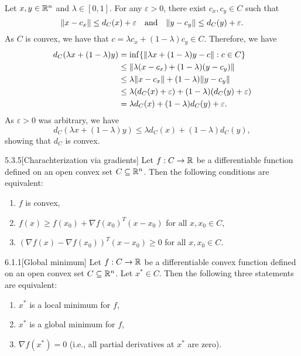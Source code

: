 \begin{solution}
  Let $x, y \in \mathbb{R}^n$ and $\lambda \in [0, 1]$.
  For any $\varepsilon > 0$, there exist $c_x, c_y \in C$ such that
  \begin{equation}
    \lVert x - c_x\rVert\leq d_C(x) + \varepsilon
    \quad\text{and}\quad
    \lVert y - c_y\rVert\leq d_C(y) + \varepsilon.
  \end{equation}
  As $C$ is convex, we have that $c = \lambda c_x + (1 - \lambda) c_y \in C$.
  Therefore, we have
  \begin{align*}
    d_C( \lambda x + (1 - \lambda) y )
    &= \inf\{ \lVert \lambda x + (1 - \lambda) y - c \rVert : c \in C \} \\
    &\leq \lVert \lambda (x - c_x) + (1 - \lambda) (y - c_y) \rVert \\
    &\leq \lambda \lVert x - c_x\rVert + (1 - \lambda) \lVert y - c_y\rVert \\
    &\leq \lambda (d_C(x) + \varepsilon) + (1 - \lambda) (d_C(y) + \varepsilon) \\
    &= \lambda d_C(x) + (1 - \lambda) d_C(y) + \varepsilon.
  \end{align*}
  As $\varepsilon > 0$ was arbitrary, we have
  \begin{equation}
    d_C( \lambda x + (1 - \lambda) y )
    \leq \lambda d_C(x) + (1 - \lambda) d_C(y),
  \end{equation}
  showing that $d_C$ is convex.
\end{solution}

\begin{manualtheorem}{5.3.5}[Charachterization via gradients]\label{thm:grad-char}
  Let $f : C \to \mathbb{R}$ be a differentiable function defined on an open convex set $C \subseteq \mathbb{R}^n$.
  Then the following conditions are equivalent:
  \begin{enumerate}[label = (\emph{\roman*})]
    \item $f$ is convex,
    \item $f(x) \geq f(x_0) + \nabla f(x_0)^T (x - x_0)$ for all $x, x_0 \in C$,
    \item $(\nabla f(x) - \nabla f(x_0))^T (x - x_0) \geq 0$ for all $x, x_0 \in C$.
  \end{enumerate}
\end{manualtheorem}

\begin{manualcorollary}{6.1.1}[Global minimum]\label{cor:global-min}
  Let $f : C \to \mathbb{R}$ be a differentiable convex function defined on an open convex set $C \subseteq \mathbb{R}^n$.
  Let $x^* \in C$.
  Then the following three statements are equivalent:
  \begin{enumerate}[label = (\emph{\roman*})]
    \item $x^*$ is a local minimum for $f$,
    \item $x^*$ is a global minimum for $f$,
    \item $\nabla f(x^*) = 0$ (i.e., all partial derivatives at $x^*$ are zero).
  \end{enumerate}
\end{manualcorollary}

